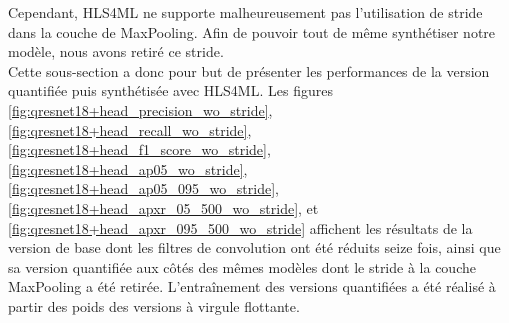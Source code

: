 Cependant, HLS4ML ne supporte malheureusement pas l'utilisation de stride dans la couche de MaxPooling. Afin de pouvoir tout de même synthétiser notre modèle, nous avons retiré ce stride.\\

Cette sous-section a donc pour but de présenter les performances de la version quantifiée puis synthétisée avec HLS4ML. Les figures \ref{fig:qresnet18+head_precision_wo_stride}, \ref{fig:qresnet18+head_recall_wo_stride}, \ref{fig:qresnet18+head_f1_score_wo_stride}, \ref{fig:qresnet18+head_ap05_wo_stride}, \ref{fig:qresnet18+head_ap05_095_wo_stride}, \ref{fig:qresnet18+head_apxr_05_500_wo_stride}, et \ref{fig:qresnet18+head_apxr_095_500_wo_stride} affichent les résultats de la version de base dont les filtres de convolution ont été réduits seize fois, ainsi que sa version quantifiée aux côtés des mêmes modèles dont le stride à la couche MaxPooling a été retirée. L'entraînement des versions quantifiées a été réalisé à partir des poids des versions à virgule flottante.

